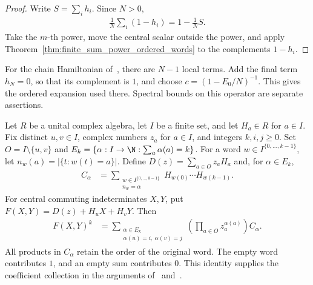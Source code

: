 \begin{proof}
    \leanok
    Write $S=\sum_i h_i$. Since $N>0$,
    \begin{align}
        \frac1N\sum_i(1-h_i)=1-\frac1N S.
    \end{align}
    Take the $m$-th power, move the central scalar outside the power,
    and apply Theorem~\ref{thm:finite_sum_power_ordered_words} to the
    complements $1-h_i$.
\end{proof}

For the chain Hamiltonian of~\cite{Landau2013PolynomialTime}, there are
$N-1$ local terms. Add the final term $h_N=0$, so that its complement is
$1$, and choose $c=(1-E_0/N)^{-1}$. This gives the ordered expansion used
there. Spectral bounds on this operator are separate assertions.

\begin{theorem}
    \label{thm:two_marker_full_word_counts}
    \leanok
    Let $R$ be a unital complex algebra, let $I$ be a finite set, and
    let $H_a\in R$ for $a\in I$. Fix distinct $u,v\in I$, complex numbers
    $z_a$ for $a\in I$, and integers $k,i,j\ge0$. Set
    $O=I\setminus\{u,v\}$ and $E_k=\{\alpha:I\to\N:\sum_a\alpha(a)=k\}$.
    For a word $w\in I^{\{0,\ldots,k-1\}}$, let
    $n_w(a)=|\{t:w(t)=a\}|$. Define $D(z)=\sum_{a\in O}z_aH_a$
    and, for $\alpha\in E_k$,
    \begin{align}
        C_\alpha
         & =\sum_{\substack{w\in I^{\{0,\ldots,k-1\}}\\n_w=\alpha}}
        H_{w(0)}\cdots H_{w(k-1)}.
    \end{align}
    For central commuting indeterminates $X,Y$, put
    $F(X,Y)=D(z)+H_uX+H_vY$. Then
    \begin{align}
        [Y^j][X^i]F(X,Y)^k
         & =\sum_{\substack{\alpha\in E_k\\\alpha(u)=i,\ \alpha(v)=j}}
        \left(\prod_{a\in O}z_a^{\alpha(a)}\right)C_\alpha.
        \label{eq:two_marker_full_counts}
    \end{align}
    All products in $C_\alpha$ retain the order of the original word.
    The empty word contributes $1$, and an empty sum contributes $0$.
    This identity supplies the coefficient collection in the arguments
    of~\cite[Lemma~4.2]{Arad2013AreaLaw}
    and~\cite[proof of Proposition~5.7]{Arad2016RigorousRG}.
\end{theorem}

